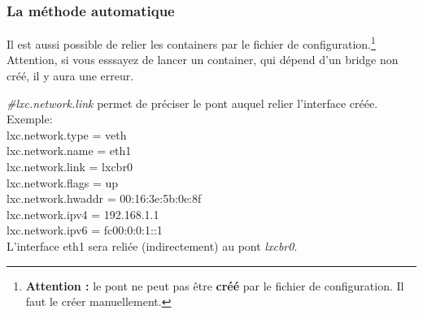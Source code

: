 \documentclass{article}
\begin{document}
\subsubsection{La m\'ethode automatique}

Il est aussi possible de relier les containers par le fichier de configuration.\footnote{\textbf{Attention : }le pont ne peut pas \^etre \textbf{cr\'e\'e} par le fichier de configuration. Il faut le cr\'eer manuellement.}
Attention, si vous esssayez de lancer un container, qui d\'epend d'un bridge non cr\'e\'e, il y aura une erreur.

\noindent
\emph{\#lxc.network.link} permet de pr\'eciser le pont auquel relier l'interface cr\'e\'ee.\\

Exemple:\\
\noindent
lxc.network.type = veth\\
lxc.network.name = eth1\\
lxc.network.link = lxcbr0\\
lxc.network.flags = up\\
lxc.network.hwaddr = 00:16:3e:5b:0e:8f\\
lxc.network.ipv4 = 192.168.1.1\\
lxc.network.ipv6 = fc00:0:0:1::1\\

\noindent
L'interface eth1 sera reli\'ee (indirectement) au pont \emph{lxcbr0}.
\end{document}
